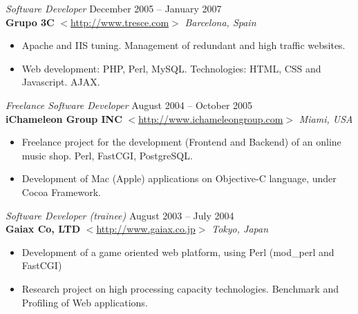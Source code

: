 \documentclass[line,margin]{res}
\begin{document}
\begin{resume}
               {\sl Software Developer} \hfill December 2005 -- January 2007 \\
                \textbf{Grupo 3C} 
                $<$\url{http://www.tresce.com}$>$ \hfill \textit{Barcelona, 
                Spain}
                \begin{itemize}  \itemsep 2pt %
                \item Apache and IIS tuning. Management of redundant and high 
                traffic websites.
                \item Web development: PHP, Perl, MySQL. Technologies: HTML,
                CSS and Javascript. AJAX.
                \\
                \end{itemize} 

                {\sl Freelance Software Developer} \hfill August 2004 -- October 
                2005 \\
                \textbf{iChameleon Group INC} 
                $<$\url{http://www.ichameleongroup.com}$>$ \hfill \textit{Miami, USA}
                \begin{itemize}  \itemsep 2pt %
                \item Freelance project for the development (Frontend
                and Backend) of an online music shop. Perl, FastCGI, PostgreSQL.
                \item Development of Mac (Apple) applications on Objective-C
                language, under Cocoa Framework.
                \\
                \end{itemize}

               {\sl Software Developer (trainee)} \hfill August 2003 -- July 
                2004 \\
                \textbf{Gaiax Co, LTD} 
                $<$\url{http://www.gaiax.co.jp}$>$ \hfill \textit{Tokyo, 
                Japan}
                \begin{itemize}  \itemsep 2pt %
                \item Development of a game oriented web platform, 
                using Perl (mod\_perl and FastCGI)
                \item Research project on high processing capacity 
                technologies. Benchmark and Profiling of Web applications.
                \\
                \end{itemize} 


\end{resume}
\end{document}
